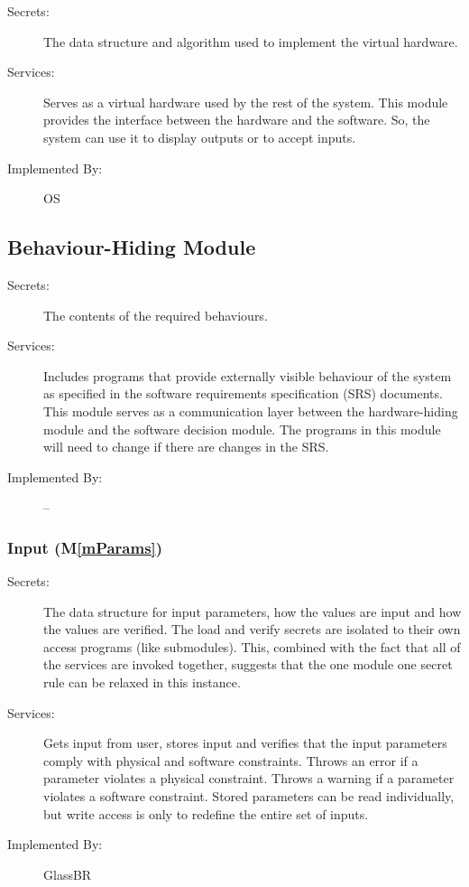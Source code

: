 \documentclass[12pt]{article}
\newcommand{\mref}[1]{M\ref{#1}}
\newcommand{\progname}{GlassBR}
\begin{document}
\begin{description}
\item[Secrets:]The data structure and algorithm used to implement the virtual
  hardware.
\item[Services:]Serves as a virtual hardware used by the rest of the
  system. This module provides the interface between the hardware and the
  software. So, the system can use it to display outputs or to accept inputs.
\item[Implemented By:] OS
\end{description}

\subsection{Behaviour-Hiding Module}

\begin{description}
\item[Secrets:]The contents of the required behaviours.
\item[Services:]Includes programs that provide externally visible behaviour of
  the system as specified in the software requirements specification (SRS)
  documents. This module serves as a communication layer between the
  hardware-hiding module and the software decision module. The programs in this
  module will need to change if there are changes in the SRS.
\item[Implemented By:] --
\end{description}

\subsubsection{Input (\mref{mParams})}

\begin{description}
\item[Secrets:] The data structure for input parameters, how the
values are input and how the values are verified.  The load and verify secrets
are isolated to their own access programs (like submodules).  This, combined
with the fact that all of the services are invoked together, suggests that the
one module one secret rule can be relaxed in this instance.
\item[Services:] Gets input from user, stores input and verifies that the
  input parameters comply with physical and software constraints. Throws an
  error if a parameter violates a physical constraint. Throws a warning if a
  parameter violates a software constraint.  Stored parameters can be read
  individually, but write access is only to redefine the entire set of inputs.
\item[Implemented By:] \progname{}
\end{description}
\end{document}
